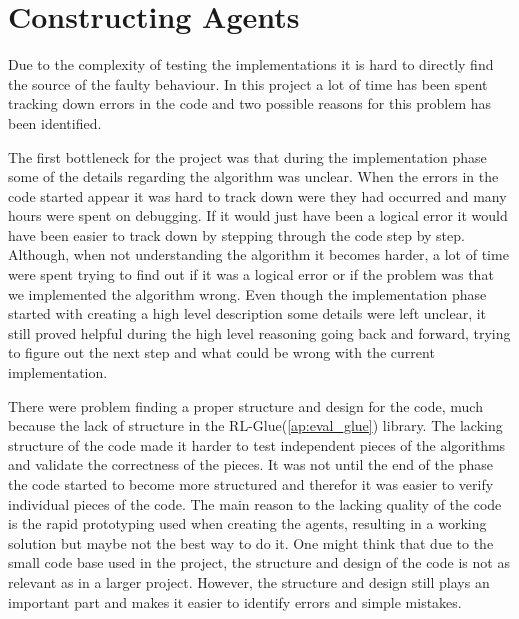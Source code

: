 \section{Constructing Agents}
\label{ap:constructing_experiments}
Due to the complexity of testing the implementations it is hard to directly find the source of the faulty behaviour. In this project a lot of time has been spent tracking down errors in the code and two possible reasons for this problem has been identified.

The first bottleneck for the project was that during the implementation phase some of the details regarding the algorithm was unclear. When the errors in the code started appear it was hard to track down were they had occurred and many hours were spent on debugging. If it would just have been a logical error it would have been easier to track down by stepping through the code step by step. Although, when not understanding the algorithm it becomes harder, a lot of time were spent trying to find out if it was a logical error or if the problem was that we implemented the algorithm wrong. Even though the implementation phase started with creating a high level description some details were left unclear, it still proved helpful during the high level reasoning going back and forward, trying to figure out the next step and what could be wrong with the current implementation.

There were problem finding a proper structure and design for the code, much because the lack of structure in the RL-Glue(\ref{ap:eval_glue}) library. The lacking structure of the code made it harder to test independent pieces of the algorithms and validate the correctness of the pieces. It was not until the end of the phase the code started to become more structured and therefor it was easier to verify individual pieces of the code. The main reason to the lacking quality of the code is the rapid prototyping used when creating the agents, resulting in a working solution but maybe not the best way to do it. One might think that due to the small code base used in the project, the structure and design of the code is not as relevant as in a larger project. However, the structure and design still plays an important part and makes it easier to identify errors and simple mistakes.
